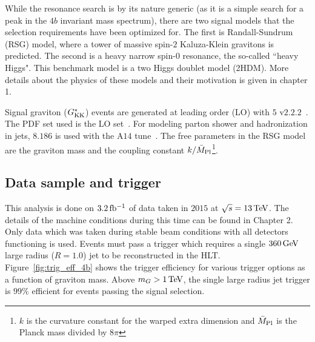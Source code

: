 While the resonance search is by its nature generic (as it is a simple search for a peak in the $4b$ invariant mass spectrum), there are two signal models that the selection requirements have been optimized for. The first is  Randall-Sundrum (RSG) model, where a tower of massive spin-$2$ Kaluza-Klein gravitons is predicted. The second is a heavy narrow spin-$0$ resonance, the so-called ``heavy Higgs". This benchmark model is a two Higgs doublet model (2HDM). More details about the physics of these models and their motivation is given in chapter 1. 

Signal graviton ($G^*_{\rm KK}$) events are generated at leading order (LO) with \MADGRAPH $5$ v$2.2.2$~\cite{MG5aMCatNLO}. The PDF set used is the  LO set~\cite{nnpdf}. For modeling parton shower and hadronization in jets, \PYTHIA $8.186$ is used with the A$14$ tune~\cite{pythia8,a14tune}. The free parameters in the RSG model are the graviton mass and the coupling constant $k/\bar{M}_{\rm Pl}$\footnote{$k$ is the curvature constant for the warped extra dimension and $\bar{M}_{\rm Pl}$ is the Planck mass divided by $8\pi$}. 

\subsection{Data sample and trigger}

This analysis is done on $3.2 \mbox{\,fb$^{-1}$}$ of data taken in $2015$ at $\sqrt{s} = 13 \TeV$. The details of the machine conditions during this time can be found in Chapter 2. Only data which was taken during stable beam conditions with all detectors functioning is used. Events must pass a trigger which requires a single $360 \GeV$ large radius ($R=1.0$) jet to be reconstructed in the HLT. Figure~\ref{fig:trig_eff_4b} shows the trigger efficiency for various trigger options as a function of graviton mass. Above $m_{G} > 1 \TeV$, the single large radius jet trigger is $99\%$ efficient for events passing the signal selection. 

